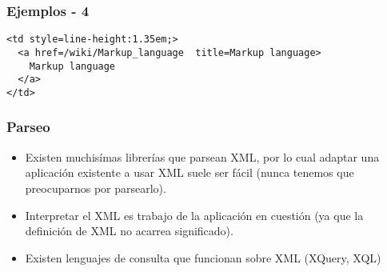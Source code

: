 \begin{frame}
\frametitle{Ejemplos - 4}
\footnotesize
\texttt{<td style=\dquote line-height:1.35em;\dquote>		\\
	~~<a href=\dquote /wiki/Markup\_language\dquote ~
		title=\dquote Markup language\dquote>		\\
	~~~~Markup language					\\
	~~</a>							\\
	</td>
}
\end{frame}

\begin{frame}
\frametitle{Parseo}
\begin{itemize}
	\item	Existen muchisímas librerías que parsean XML, por lo cual
		adaptar una aplicación existente a usar XML suele ser fácil
		(nunca tenemos que preocuparnos por parsearlo).
		\pause

	\item	Interpretar el XML es trabajo de la aplicación en cuestión
		(ya que la definición de XML no acarrea significado).
		\pause

	\item	Existen lenguajes de consulta que funcionan sobre XML
		(XQuery, XQL)
\end{itemize}
\end{frame}
